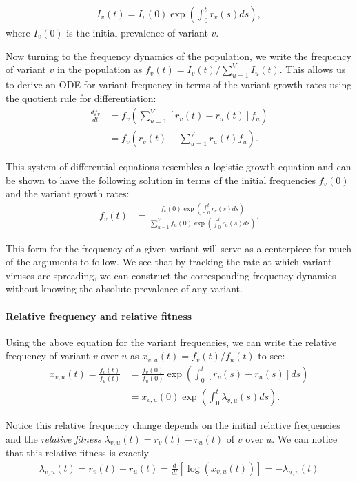 \documentclass[12pt,oneside,letterpaper]{article}
\begin{document}
\begin{align*}
I_{v}(t) = I_{v}(0) \exp\left( \int_{0}^{t} r_{v}(s) ds\right),
\end{align*}
where $I_{v}(0)$ is the initial prevalence of variant $v$.

Now turning to the frequency dynamics of the population, we write the frequency of variant $v$ in the population as  $f_{v}(t) = I_{v}(t) / \sum_{u=1}^{V} I_{u}(t)$.
This allows us to derive an ODE for variant frequency in terms of the variant growth rates using the quotient rule for differentiation:
\begin{align*}
    \frac{d f_{v}}{d t} &= f_{v} \left( \sum_{u=1}^{V} [r_{v}(t) - r_{u}(t)] f_{u} \right)\\
                        &= f_{v} \left( r_{v}(t) - \sum_{u=1}^{V} r_{u}(t) f_{u} \right).
\end{align*}

This system of differential equations resembles a logistic growth equation and can be shown to have the following solution in terms of the initial frequencies $f_{v}(0)$ and the variant growth rates:
\begin{align}
    f_{v}(t) &= \frac{ f_{v}(0) \exp( \int_{0}^{t} r_{v}(s) ds)}{\sum_{u=1}^{V}  f_{u}(0) \exp( \int_{0}^{t} r_{u}(s) ds)}.
\end{align}

This form for the frequency of a given variant will serve as a centerpiece for much of the arguments to follow.
We see that by tracking the rate at which variant viruses are spreading, we can construct the corresponding frequency dynamics without knowing the absolute prevalence of any variant.

\paragraph{Relative frequency and relative fitness}%

Using the above equation for the variant frequencies, we can write the relative frequency of variant $v$ over $u$ as $x_{v,u}(t) = f_{v}(t) / f_{u}(t)$ to see:
\begin{align*}
    x_{v, u}(t) = \frac{f_{v}(t)}{f_{u}(t)} &= \frac{f_{v}(0)}{f_{u}(0)} \exp \left( \int_{0}^{t} [r_{v}(s) - r_{u}(s)] ds \right)\\
                                            &=x_{v,u}(0)\exp \left( \int_{0}^{t} \lambda_{v,u}(s) ds \right).
\end{align*}

Notice this relative frequency change depends on the initial relative frequencies and the \emph{relative fitness} $\lambda_{v,u}(t) = r_{v}(t) - r_{u}(t)$ of $v$ over $u$.
We can notice that this relative fitness is exactly
\begin{align}
\lambda_{v, u}(t) = r_{v}(t) - r_{u}(t) = \frac{d }{d t} \left[\log \left( x_{v,u}(t) \right) \right] = - \lambda_{u,v}(t)
\end{align}
\end{document}
